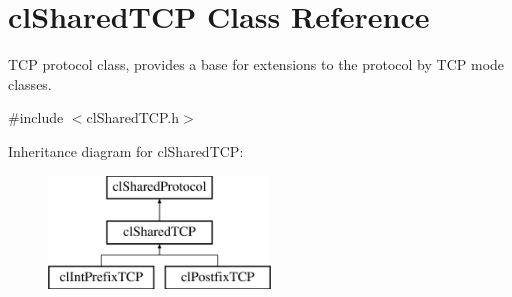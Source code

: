 \hypertarget{classcl_shared_t_c_p}{
\section{clSharedTCP Class Reference}
\label{classcl_shared_t_c_p}
}


TCP protocol class, provides a base for extensions to the protocol by TCP mode classes.  




{\ttfamily \#include $<$clSharedTCP.h$>$}

Inheritance diagram for clSharedTCP:\begin{figure}[H]
\begin{center}
\leavevmode
\includegraphics[height=3.000000cm]{classcl_shared_t_c_p}
\end{center}
\end{figure}
